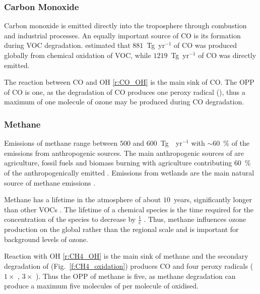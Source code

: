 \vspace{-2mm}
\subsubsection{Carbon Monoxide}
\vspace{-2mm}
Carbon monoxide is emitted directly into the troposphere through combustion and industrial processes.
An equally important source of CO is its formation during VOC degradation.
\citet{Hauglustaine:1998} estimated that $881$~Tg~yr$^{-1}$ of CO was produced globally from chemical oxidation of VOC, while $1219$~Tg~yr$^{-1}$ of CO was directly emitted.

The reaction between CO and OH \eqref{r:CO_OH} is the main sink of CO.
The OPP of CO is one, as the degradation of CO produces one peroxy radical (), thus a maximum of one molecule of ozone may be produced during CO degradation.

\vspace{-3mm}
\subsubsection{Methane}
\vspace{-4mm}
Emissions of methane range between $500$ and $600$~Tg~~yr$^{-1}$ with ${\sim}60$~\% of the emissions from anthropogenic sources.
The main anthropogenic sources of  are agriculture, fossil fuels and biomass burning with agriculture contributing $60$~\% of the anthropogenically emitted .
Emissions from wetlands are the main natural source of methane emissions \citep{Kirschke:2013}.

Methane has a lifetime in the atmosphere of about $10$~years, significantly longer than other VOCs \citep{Voulgarakis:2013}.
The lifetime of a chemical species is the time required for the concentration of the species to decrease by $\frac{1}{e}$ \citep{Seinfeld:2006}.
Thus, methane influences ozone production on the global rather than the regional scale and is important for background levels of ozone.  

Reaction with OH \eqref{r:CH4_OH} is the main sink of methane and the secondary degradation of  (Fig.~\ref{f:CH4_oxidation}) produces CO and four peroxy radicals ($1 \times$ , $3 \times$ ).
Thus the OPP of methane is five, as methane degradation can produce a maximum five molecules of  per molecule of  oxidised. 

\vspace{-5mm}
